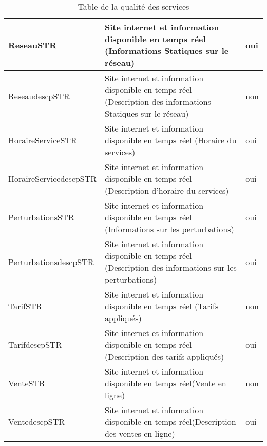 \begin{table}[H]
\begin{center}
\begin{tabularx}{17.5cm}{|p{4cm}|X|p{2.5cm}|}
				\hline
				ReseauSTR                 & Site internet et information disponible  en temps réel (Informations Statiques sur le réseau)                 & oui              \\
				\hline
				ReseaudescpSTR            & Site internet et information disponible  en temps réel (Description des informations Statiques sur le réseau) & non              \\
				\hline
				HoraireServiceSTR         & Site internet et information disponible  en temps réel (Horaire du services)                                  & oui              \\
				\hline
				HoraireServicedescpSTR    & Site internet et information disponible  en temps réel (Description d'horaire du services)                    & oui              \\
				\hline
				PerturbationsSTR          & Site internet et information disponible  en temps réel (Informations sur les perturbations)                   & oui              \\
				\hline
				PerturbationsdescpSTR     & Site internet et information disponible  en temps réel (Description des informations sur les perturbations)   & oui              \\
				\hline
				TarifSTR                  & Site internet et information disponible  en temps réel (Tarifs appliqués)                                     & non              \\
				\hline
				TarifdescpSTR             & Site internet et information disponible  en temps réel (Description des tarifs appliqués)                     & oui              \\
				\hline
				VenteSTR                  & Site internet et information disponible  en temps réel(Vente en ligne)                                        & non              \\
				\hline
				VentedescpSTR             & Site internet et information disponible  en temps réel(Description des ventes en ligne)                       & oui              \\
				\hline
			\end{tabularx}
			\caption{Table de la qualité des services}
		\end{center}
	\end{table}
